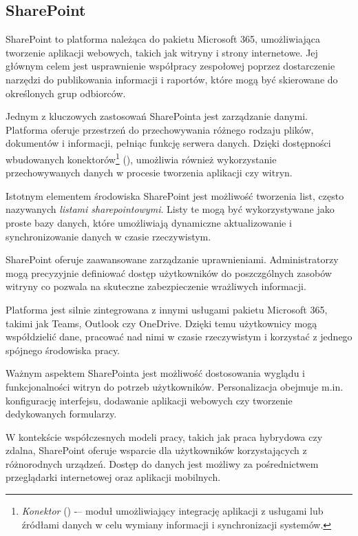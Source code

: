 \subsection{SharePoint}
SharePoint to platforma należąca do pakietu Microsoft 365, umożliwiająca tworzenie aplikacji webowych, takich jak witryny i strony internetowe. Jej głównym celem jest usprawnienie współpracy zespołowej poprzez dostarczenie narzędzi do publikowania informacji i raportów, które mogą być skierowane do określonych grup odbiorców. \par
Jednym z kluczowych zastosowań SharePointa jest zarządzanie danymi. Platforma oferuje przestrzeń do przechowywania różnego rodzaju plików, dokumentów i informacji, pełniąc funkcję serwera danych. Dzięki dostępności wbudowanych konektorów\footnote{\emph{Konektor} () -– moduł umożliwiający integrację aplikacji z usługami lub źródłami danych w celu wymiany informacji i synchronizacji systemów.} (), umożliwia również wykorzystanie przechowywanych danych w procesie tworzenia aplikacji czy witryn. \par
Istotnym elementem środowiska SharePoint jest możliwość tworzenia list, często nazywanych \emph{listami sharepointowymi}. Listy te mogą być wykorzystywane jako proste bazy danych, które umożliwiają dynamiczne aktualizowanie i synchronizowanie danych w czasie rzeczywistym. \par
SharePoint oferuje zaawansowane zarządzanie uprawnieniami. Administratorzy mogą precyzyjnie definiować dostęp użytkowników do poszczgólnych zasobów witryny co pozwala na skuteczne zabezpieczenie wrażliwych informacji. \par
Platforma jest silnie zintegrowana z innymi usługami pakietu Microsoft 365, takimi jak Teams, Outlook czy OneDrive. Dzięki temu użytkownicy mogą współdzielić dane, pracować nad nimi w czasie rzeczywistym i korzystać z jednego spójnego środowiska pracy. \par
Ważnym aspektem SharePointa jest możliwość dostosowania wyglądu i funkcjonalności witryn do potrzeb użytkowników. Personalizacja obejmuje m.in. konfigurację interfejsu, dodawanie aplikacji webowych czy tworzenie dedykowanych formularzy. \par
W kontekście współczesnych modeli pracy, takich jak praca hybrydowa czy zdalna, SharePoint oferuje wsparcie dla użytkowników korzystających z różnorodnych urządzeń. Dostęp do danych jest możliwy za pośrednictwem przeglądarki internetowej oraz aplikacji mobilnych.

\begin{comment}
SharePoint to platforma wchodząca w skład pakietu Microsoft 365, która służy do zarządzania dokumentami oraz umożliwia efektywną współpracę zespołową. Dzięki niej użytkownicy mogą tworzyć i korzystać z własnych przestrzeni roboczych online, takich jak listy czy  archiwa plików, co znacząco ułatwia organizację oraz szybki dostęp do danych.

Listy sharepointowe mogą pełnić funkcję prostych baz danych, które można łatwo zintegrować z takimi narzędziami jak PowerApps, PowerAutomate, czy Excel. Takie rozwiązanie umożliwia dynamiczne aktualizowanie i synchronizowanie danych w czasie rzeczywistym.
\end{comment}


